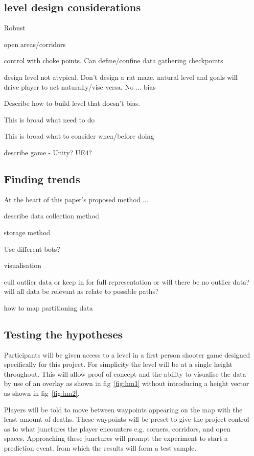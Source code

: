 \documentclass[journal]{IEEEtran}
\begin{document}
\subsection{level design considerations}

Robust

open areas/corridors

control with choke points. Can define/confine data gathering checkpoints

design level not atypical. Don't design a rat maze. natural level and goals will drive player to act naturally/vise versa. No ... bias

Describe how to build level that doesn't bias.

This is broad what need to do

This is broad what to consider when/before doing

describe game - Unity? UE4?

\subsection{Finding trends}

At the heart of this paper's proposed method ...

describe data collection method

storage method

Use different bots?

visualisation

cull outlier data or keep in for full representation or will there be no outlier data? will all data be relevant as relate to possible paths?

how to map partitioning data

\subsection{Testing the hypotheses}

Participants will be given access to a level in a first person shooter game designed specifically for this project. For simplicity the level will be at a single height throughout. This will allow proof of concept and the ability to visualise the data by use of an overlay as shown in fig~\ref{fig:hm1} without introducing a height vector as shown in fig~\ref{fig:hm2}.

Players will be told to move between waypoints appearing on the map with the least amount of deaths. These waypoints will be preset to give the project control as to what junctures the player encounters e.g. corners, corridors, and open spaces. Approaching these junctures will prompt the experiment to start a prediction event, from which the results will form a test sample.
\end{document}
